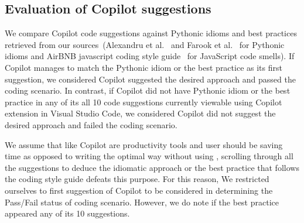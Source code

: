 \subsection{Evaluation of Copilot suggestions}
\label{evaluation}
We compare Copilot code suggestions against Pythonic idioms and best practices retrieved from our sources~(Alexandru et al.~\cite{Alexandru2018} and Farook et al.~\cite{idioms} for Pythonic idioms and AirBNB javascript coding style guide~\cite{airbnb_code} for JavaScript code smells). If Copilot manages to match the Pythonic idiom or the best practice as its first suggestion, we considered Copilot suggested the desired approach and passed the coding scenario. 
In contrast, if Copilot did not have Pythonic idiom or the best practice in any of its all 10 code suggestions currently viewable using Copilot extension in Visual Studio Code, we considered Copilot did not suggest the desired approach and failed the coding scenario.

We assume that \cct{} like Copilot are productivity tools and user should be saving time as opposed to writing the optimal way without using \cct{}, scrolling through all the suggestions to deduce the idiomatic approach or the best practice that follows the coding style guide defeats this purpose. 
For this reason, We restricted ourselves to first suggestion of Copilot to be considered in determining the Pass/Fail status of coding scenario. However, we do note if the best practice appeared any of its 10 suggestions.